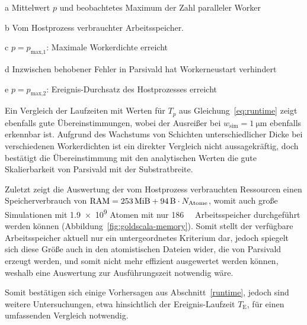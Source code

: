 \begin{table}[b!]
\begin{threeparttable}
    \begin{tablenotes}
    \item[a] Mittelwert $p$ und beobachtetes Maximum der Zahl paralleler Worker
    \item[b] Vom Hostprozess verbrauchter Arbeitsspeicher.
    \item[c] $p = p_\text{max,1}$: Maximale Workerdichte erreicht
    \item[d] Inzwischen behobener Fehler in Parsivald hat Workerneustart verhindert
    \item[e] $p = p_\text{max,2}$: Ereignis-Durchsatz des Hostprozesses erreicht
    \end{tablenotes}

  \end{threeparttable}
\end{table}

Ein Vergleich der Laufzeiten mit Werten für $T_p$ aus Gleichung~\ref{eq:runtime} zeigt ebenfalls gute Übereinstimmungen, wobei der Ausreißer bei $w_\text{sim} = \SI{1}{\micro\meter}$ ebenfalls erkennbar ist.
Aufgrund des Wachstums von Schichten unterschiedlicher Dicke bei verschiedenen Workerdichten ist ein direkter Vergleich nicht aussagekräftig, doch bestätigt die Übereinstimmung mit den analytischen Werten die gute Skalierbarkeit von Parsivald mit der Substratbreite.

Zuletzt zeigt die Auswertung der vom Hostprozess verbrauchten Ressourcen einen Speicherverbrauch von $\text{RAM} = \SI{253}{\mebi\byte} + \SI{94}{\byte} \cdot N_\text{Atome}$, womit auch große Simulationen mit \num{1.9e9} Atomen mit nur \SI{186}{\gibi\byte} Arbeitsspeicher durchgeführt werden können (Abbildung~\ref{fig:goldscala-memory}).
Somit stellt der verfügbare Arbeitsspeicher aktuell nur ein untergeordnetes Kriterium dar, jedoch spiegelt sich diese Größe auch in den atomistischen Dateien wider, die von Parsivald erzeugt werden, und somit nicht mehr effizient ausgewertet werden können, weshalb eine Auswertung zur Ausführungszeit notwendig wäre.

Somit bestätigen sich einige Vorhersagen aus Abschnitt~\ref{runtime}, jedoch sind weitere Untersuchungen, etwa hinsichtlich der Ereignis-Laufzeit $T_\text{E}$, für einen umfassenden Vergleich notwendig.

\vspace{2em}

